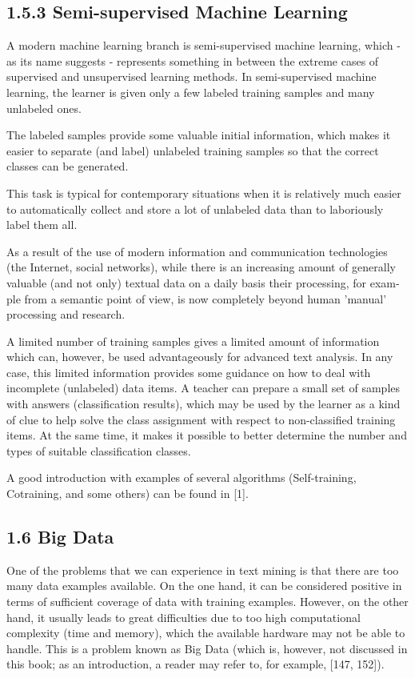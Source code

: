 \documentclass[10pt]{book}
\begin{document}
\subsection*{1.5.3 Semi-supervised Machine Learning}
A modern machine learning branch is semi-supervised machine learning, which - as its name suggests - represents something in between the extreme cases of supervised and unsupervised learning methods. In semi-supervised machine learning, the learner is given only a few labeled training samples and many unlabeled ones.

The labeled samples provide some valuable initial information, which makes it easier to separate (and label) unlabeled training samples so that the correct classes can be generated.

This task is typical for contemporary situations when it is relatively much easier to automatically collect and store a lot of unlabeled data than to laboriously label them all.

As a result of the use of modern information and communication technologies (the Internet, social networks), while there is an increasing amount of generally valuable (and not only) textual data on a daily basis their processing, for exam-\\
ple from a semantic point of view, is now completely beyond human 'manual' processing and research.

A limited number of training samples gives a limited amount of information which can, however, be used advantageously for advanced text analysis. In any case, this limited information provides some guidance on how to deal with incomplete (unlabeled) data items. A teacher can prepare a small set of samples with answers (classification results), which may be used by the learner as a kind of clue to help solve the class assignment with respect to non-classified training items. At the same time, it makes it possible to better determine the number and types of suitable classification classes.

A good introduction with examples of several algorithms (Self-training, Cotraining, and some others) can be found in [1].

\subsection*{1.6 Big Data}
One of the problems that we can experience in text mining is that there are too many data examples available. On the one hand, it can be considered positive in terms of sufficient coverage of data with training examples. However, on the other hand, it usually leads to great difficulties due to too high computational complexity (time and memory), which the available hardware may not be able to handle. This is a problem known as Big Data (which is, however, not discussed in this book; as an introduction, a reader may refer to, for example, [147, 152]).
\end{document}
